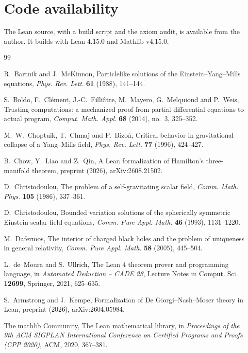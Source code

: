 \documentclass[11pt]{amsart}
\theoremstyle{definition}
\theoremstyle{remark}
\begin{document}
\section*{Code availability}
The Lean source, with a build script and the axiom audit, is available from the author. It builds with Lean 4.15.0 and Mathlib v4.15.0.

\begin{thebibliography}{99}

R.~Bartnik and J.~McKinnon, Particlelike solutions of the Einstein--Yang--Mills equations, \emph{Phys. Rev. Lett.} \textbf{61} (1988), 141--144.

S.~Boldo, F.~Cl\'ement, J.-C.~Filli\^atre, M.~Mayero, G.~Melquiond and P.~Weis, Trusting computations: a mechanized proof from partial differential equations to actual program, \emph{Comput. Math. Appl.} \textbf{68} (2014), no.~3, 325--352.

M.~W.~Choptuik, T.~Chmaj and P.~Bizo\'n, Critical behavior in gravitational collapse of a Yang--Mills field, \emph{Phys. Rev. Lett.} \textbf{77} (1996), 424--427.

B.~Chow, Y.~Liao and Z.~Qin, A Lean formalization of Hamilton's three-manifold theorem, preprint (2026), arXiv:2608.21502.

D.~Christodoulou, The problem of a self-gravitating scalar field, \emph{Comm. Math. Phys.} \textbf{105} (1986), 337--361.

D.~Christodoulou, Bounded variation solutions of the spherically symmetric Einstein-scalar field equations, \emph{Comm. Pure Appl. Math.} \textbf{46} (1993), 1131--1220.

M.~Dafermos, The interior of charged black holes and the problem of uniqueness in general relativity, \emph{Comm. Pure Appl. Math.} \textbf{58} (2005), 445--504.

L.~de~Moura and S.~Ullrich, The Lean 4 theorem prover and programming language, in \emph{Automated Deduction -- CADE 28}, Lecture Notes in Comput. Sci. \textbf{12699}, Springer, 2021, 625--635.

S.~Armstrong and J.~Kempe, Formalization of De Giorgi--Nash--Moser theory in Lean, preprint (2026), arXiv:2604.05984.

The mathlib Community, The Lean mathematical library, in \emph{Proceedings of the 9th ACM SIGPLAN International Conference on Certified Programs and Proofs (CPP 2020)}, ACM, 2020, 367--381.


\end{thebibliography}
\end{document}
